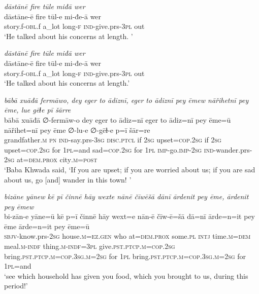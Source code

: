 \ea \label{BP.158}
\textit{dāstānē fire tūle miđā wer} \\ 
\gll dāstāne-ē fire tūl-e mi-đe-ā wer \\ 
 story.f\textsc{-obl}.f a\_lot long\textsc{-f} \textsc{ind-}give.prs\textsc{-3pl} out \\ 
\glt `He talked about his concerns at length. '
\z 
 
\ea \label{BP.159}
\textit{dāstānē fire tūle miđā wer} \\ 
\gll dāstāne-ē fire tūl-e mi-đe-ā wer \\ 
 story.f\textsc{-obl}.f a\_lot long\textsc{-f} \textsc{ind-}give.prs\textsc{-3pl} out \\ 
\glt `He talked about his concerns at length.'
\z 
 
\ea \label{BP.160}
\textit{bābā xuāđā fermāwo, dey eger to ādiznī, eger to ādiznī pey ēmew nāřihetnī pey ēme, lue gēɫe pī šārre} \\ 
\gll bābā xuāđā ∅-fermāw-o dey eger to ādiz=nī eger to ādiz=nī pey ēme=ū nāřihet=nī pey ēme ∅-lu-e ∅-gēɫ-e p=ī šār=re \\ 
 grandfather\textsc{.m} \textsc{pn} \textsc{ind-}say.prs\textsc{-3sg} \textsc{disc.ptcl} if \textsc{2sg} upset\textsc{=cop}\textsc{.\textsc{2sg}} if \textsc{2sg} upset\textsc{=cop}\textsc{.\textsc{2sg}} for \textsc{1pl}=and sad\textsc{=cop}\textsc{.\textsc{2sg}} for \textsc{1pl} \textsc{imp-}go.\textsc{imp-}\textsc{2sg} \textsc{ind-}wander.prs-\textsc{2sg} at=\textsc{dem.prox} city\textsc{.m}\textsc{=\textsc{post}} \\ 
\glt `Baba Khwada said, ‘If you are upset; if you are worried about us; if you are sad about us, go [and] wander in this town! '
\z 
 
\ea \label{BP.161}
\textit{bizāne yānew kē pī činnē hāy wexte nānē čīwēšā dānī ārdenit pey ēme, ārdenit pey ēmew} \\ 
\gll bi-zān-e yāne=ū kē p=ī činnē hāy wext=e nān-ē čīw-ē=šā dā=nī ārde=n=it pey ēme ārde=n=it pey ēme=ū \\ 
 \textsc{sbjv-}know.prs-\textsc{2sg} house\textsc{.m}\textsc{=ez.gen} who at=\textsc{dem.prox} some\textsc{.pl} \textsc{intj} time\textsc{.m}\textsc{=dem} meal\textsc{.m}\textsc{-indf} thing\textsc{.m}\textsc{-indf}\textsc{=3pl} give\textsc{.pst}\textsc{.ptcp}\textsc{.m}\textsc{=cop}\textsc{.\textsc{2sg}} bring\textsc{.pst}\textsc{.ptcp}\textsc{.m}\textsc{=cop}\textsc{.3sg}\textsc{.m}\textsc{=\textsc{2sg}} for \textsc{1pl} bring\textsc{.pst}\textsc{.ptcp}\textsc{.m}\textsc{=cop}\textsc{.3sg}\textsc{.m}\textsc{=\textsc{2sg}} for \textsc{1pl}=and \\ 
\glt `see which household has given you food, which you brought to us, during this period!'
\z 
 
